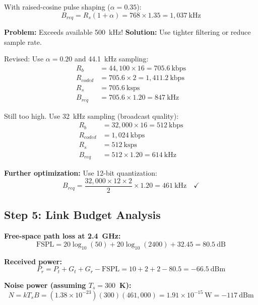 With raised-cosine pulse shaping ($\alpha = 0.35$):
\begin{equation}
B_{req} = R_s (1 + \alpha) = 768 \times 1.35 = 1{,}037~\text{kHz}
\end{equation}

\textbf{Problem:} Exceeds available 500~kHz! \textbf{Solution:} Use tighter filtering or reduce sample rate.

Revised: Use $\alpha = 0.20$ and 44.1~kHz sampling:
\begin{align}
R_b &= 44{,}100 \times 16 = 705.6~\text{kbps} \\
R_{coded} &= 705.6 \times 2 = 1{,}411.2~\text{kbps} \\
R_s &= 705.6~\text{ksps} \\
B_{req} &= 705.6 \times 1.20 = 847~\text{kHz}
\end{align}

Still too high. Use 32~kHz sampling (broadcast quality):
\begin{align}
R_b &= 32{,}000 \times 16 = 512~\text{kbps} \\
R_{coded} &= 1{,}024~\text{kbps} \\
R_s &= 512~\text{ksps} \\
B_{req} &= 512 \times 1.20 = 614~\text{kHz}
\end{align}

\textbf{Further optimization:} Use 12-bit quantization:
\begin{equation}
B_{req} = \frac{32{,}000 \times 12 \times 2}{2} \times 1.20 = 461~\text{kHz} \quad \checkmark
\end{equation}

\subsection*{Step 5: Link Budget Analysis}

\textbf{Free-space path loss at 2.4~GHz:}
\begin{equation}
\mathrm{FSPL} = 20\log_{10}(50) + 20\log_{10}(2400) + 32.45 = 80.5~\text{dB}
\end{equation}

\textbf{Received power:}
\begin{equation}
P_r = P_t + G_t + G_r - \mathrm{FSPL} = 10 + 2 + 2 - 80.5 = -66.5~\text{dBm}
\end{equation}

\textbf{Noise power (assuming $T_s = 300$~K):}
\begin{equation}
N = kT_sB = (1.38 \times 10^{-23})(300)(461{,}000) = 1.91 \times 10^{-15}~\text{W} = -117~\text{dBm}
\end{equation}

